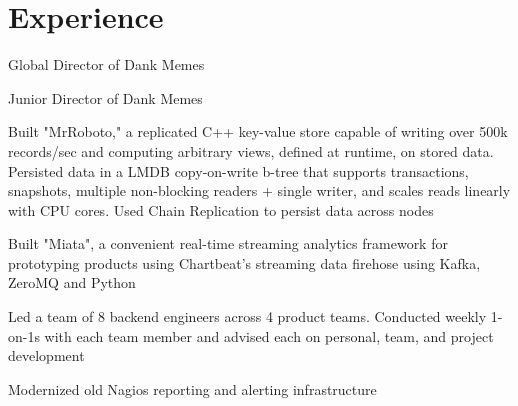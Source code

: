 \documentclass[]{resume-openfont}
\begin{document}
{}

\section{Experience}
    \begin{tightemize}
        \item
            Global Director of Dank Memes
    \end{tightemize}

    \begin{tightemize}
        \item
            Junior Director of Dank Memes
    \end{tightemize}

    \begin{tightemize}
        \item
            Built "MrRoboto," a replicated C++ key-value store capable of
            writing over 500k records/sec and computing arbitrary views,
            defined at runtime, on stored data. Persisted data in a LMDB
            copy-on-write b-tree that supports transactions, snapshots,
            multiple non-blocking readers + single writer, and scales reads
            linearly with CPU cores. Used Chain Replication to persist data
            across nodes
        \item
            Built "Miata", a convenient real-time streaming analytics framework
            for prototyping products using Chartbeat's streaming data firehose
            using Kafka, ZeroMQ and Python
        \item
            Led a team of 8 backend engineers across 4 product teams. Conducted
            weekly 1-on-1s with each team member and advised each on personal,
            team, and project development
        \item
            Modernized old Nagios reporting and alerting infrastructure
    \end{tightemize}
    \vspace{5pt}
\end{document}
